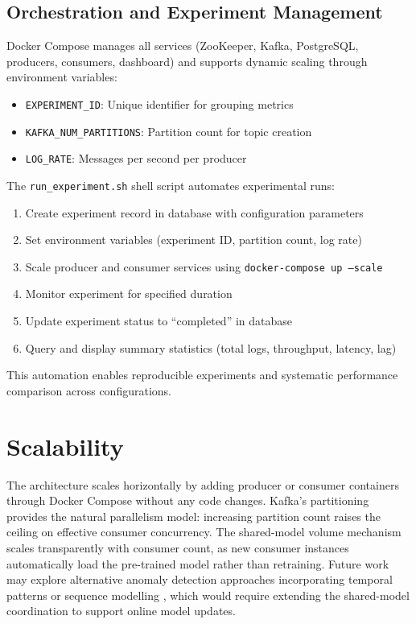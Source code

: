 \documentclass[12pt,a4paper]{report}
\begin{document}
\subsection{Orchestration and Experiment Management}

Docker Compose manages all services (ZooKeeper, Kafka, PostgreSQL, producers, consumers, dashboard) and supports dynamic scaling through environment variables:

\begin{itemize}
    \item \texttt{EXPERIMENT\_ID}: Unique identifier for grouping metrics
    \item \texttt{KAFKA\_NUM\_PARTITIONS}: Partition count for topic creation
    \item \texttt{LOG\_RATE}: Messages per second per producer
\end{itemize}

The \texttt{run\_experiment.sh} shell script automates experimental runs:
\begin{enumerate}
    \item Create experiment record in database with configuration parameters
    \item Set environment variables (experiment ID, partition count, log rate)
    \item Scale producer and consumer services using \texttt{docker-compose up --scale}
    \item Monitor experiment for specified duration
    \item Update experiment status to ``completed'' in database
    \item Query and display summary statistics (total logs, throughput, latency, lag)
\end{enumerate}

This automation enables reproducible experiments and systematic performance comparison across configurations.


\section{Scalability}

The architecture scales horizontally by adding producer or consumer containers through
Docker Compose without any code changes. Kafka's partitioning provides the natural
parallelism model: increasing partition count raises the ceiling on effective consumer
concurrency. The shared-model volume mechanism scales transparently with consumer count,
as new consumer instances automatically load the pre-trained model rather than retraining.
Future work may explore alternative anomaly detection approaches incorporating temporal
patterns or sequence modelling \cite{Du2017, Sun2021}, which would require extending the
shared-model coordination to support online model updates.
\end{document}
